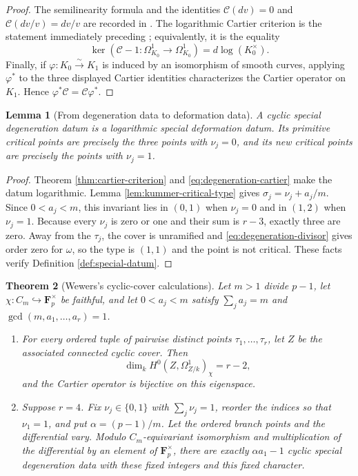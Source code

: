 \documentclass[10pt,a4paper]{amsart}
\newtheorem{theorem}{Theorem}[section]
\newtheorem{lemma}[theorem]{Lemma}
\numberwithin{equation}{section}
\begin{document}
\begin{proof}
The semilinearity formula and the identities
$\mathcal C(dv)=0$ and $\mathcal C(dv/v)=dv/v$ are recorded in
\cite[equations~(40)--(42)]{WewersMeta}.  The logarithmic Cartier criterion
is the statement immediately preceding
\cite[Definition~3.1]{WewersMeta}; equivalently, it is the equality
\[
 \ker(\mathcal C-1: \Omega^1_{K_0}\longrightarrow\Omega^1_{K_0})
   =d\log(K_0^\times).
\]
Finally, if $\varphi:K_0\xrightarrow{\sim}K_1$ is induced by an isomorphism
of smooth curves, applying $\varphi^*$ to the three displayed Cartier
identities characterizes the Cartier operator on $K_1$.  Hence
$\varphi^*\mathcal C=\mathcal C\varphi^*$.
\end{proof}

\begin{lemma}[From degeneration data to deformation data]
\label{lem:degeneration-to-deformation}
A cyclic special degeneration datum is a logarithmic special deformation
datum.  Its primitive critical points are precisely the three points with
$\nu_j=0$, and its new critical points are precisely the points with
$\nu_j=1$.
\end{lemma}

\begin{proof}
Theorem \ref{thm:cartier-criterion} and
\eqref{eq:degeneration-cartier} make the datum logarithmic.  Lemma
\ref{lem:kummer-critical-type} gives
$\sigma_j=\nu_j+a_j/m$.  Since $0<a_j<m$, this invariant lies in $(0,1)$
when $\nu_j=0$ and in $(1,2)$ when $\nu_j=1$.  Because every $\nu_j$ is
zero or one and their sum is $r-3$, exactly three are zero.  Away from the
$\tau_j$, the cover is unramified and \eqref{eq:degeneration-divisor} gives
order zero for $\omega$, so the type is $(1,1)$ and the point is not
critical.  These facts verify Definition \ref{def:special-datum}.
\end{proof}

\begin{theorem}[Wewers's cyclic-cover calculations]
\label{thm:wewers-cyclic}
Let $m>1$ divide $p-1$, let
$\chi:C_m\hookrightarrow\mathbf F_p^\times$ be faithful, and let
$0<a_j<m$ satisfy $\sum_j a_j=m$ and
$\gcd(m,a_1,\ldots,a_r)=1$.
\begin{enumerate}
\item For every ordered tuple of pairwise distinct points
$\tau_1,\ldots,\tau_r$, let $Z$ be the associated connected cyclic cover.
Then
\[
 \dim_kH^0(Z,\Omega^1_{Z/k})_\chi=r-2,
\]
and the Cartier operator is bijective on this eigenspace.
\item Suppose $r=4$.  Fix $\nu_j\in\{0,1\}$ with
$\sum_j\nu_j=1$, reorder the indices so that $\nu_1=1$, and put
$\alpha=(p-1)/m$.  Let the ordered branch points and the differential vary.
Modulo $C_m$-equivariant isomorphism and multiplication of the differential
by an element of $\mathbf F_p^\times$, there are exactly
$\alpha a_1-1$ cyclic special degeneration data with these fixed integers
and this fixed character.
\end{enumerate}
\end{theorem}
\end{document}
